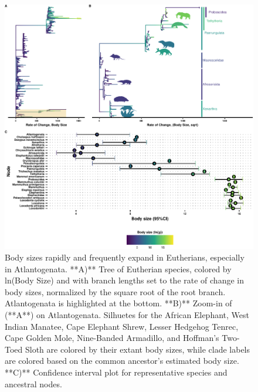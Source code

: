 \documentclass[]{elsarticle} %
\begin{document}
\begin{figure}

\includegraphics[width=6in]{paper_PLOS_draft_files/figure-latex/Figure-BodySize-1} \hfill{}

\caption{Body sizes rapidly and frequently expand in Eutherians, especially in Atlantogenata. **A)** Tree of Eutherian species, colored by ln(Body Size) and with branch lengths set to the rate of change in body sizes, normalized by the square root of the root branch. Atlantogenata is highlighted at the bottom. **B)** Zoom-in of (**A**) on Atlantogenata. Silhuetes for the African Elephant, West Indian Manatee, Cape Elephant Shrew, Lesser Hedgehog Tenrec, Cape Golden Mole, Nine-Banded Armadillo, and Hoffman's Two-Toed Sloth are colored by their extant body sizes, while clade labels are colored based on the common ancestor's estimated body size. **C)** Confidence interval plot for representative species and ancestral nodes.}\label{fig:Figure-BodySize}
\end{figure}
\end{document}

